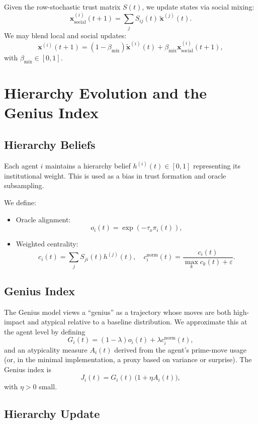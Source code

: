 \documentclass[11pt]{article}
\begin{document}
Given the row-stochastic trust matrix $S(t)$, we update states via
social mixing:
\[
  \bm{x}^{(i)}_{\text{social}}(t+1)
  = \sum_{j} S_{ij}(t) \, \tilde{\bm{x}}^{(j)}(t).
\]
We may blend local and social updates:
\[
  \bm{x}^{(i)}(t+1)
  = (1-\beta_{\text{mix}}) \tilde{\bm{x}}^{(i)}(t)
    + \beta_{\text{mix}} \bm{x}^{(i)}_{\text{social}}(t+1),
\]
with $\beta_{\text{mix}} \in [0,1]$.

\section{Hierarchy Evolution and the Genius Index}

\subsection{Hierarchy Beliefs}

Each agent $i$ maintains a hierarchy belief
$h^{(i)}(t) \in [0,1]$ representing its institutional weight.
This is used as a bias in trust formation and oracle subsampling.

We define:
\begin{itemize}[noitemsep]
  \item Oracle alignment:
    \[
      o_i(t) = \exp(-\tau_o \pi_i(t)),
    \]
  \item Weighted centrality:
    \[
      c_i(t) = \sum_j S_{ji}(t) h^{(j)}(t),
      \quad
      c_i^{\text{norm}}(t) = \frac{c_i(t)}{\max_k c_k(t) + \varepsilon}.
    \]
\end{itemize}

\subsection{Genius Index}

The Genius model views a ``genius'' as a trajectory whose moves are both
high-impact and atypical relative to a baseline distribution.
We approximate this at the agent level by defining
\[
  G_i(t) = (1-\lambda) o_i(t) + \lambda c_i^{\text{norm}}(t),
\]
and an atypicality measure $A_i(t)$ derived from the agent's prime-move
usage (or, in the minimal implementation, a proxy based on variance or
surprise).
The Genius index is
\[
  J_i(t) = G_i(t) \, \bigl( 1 + \eta A_i(t) \bigr),
\]
with $\eta > 0$ small.

\subsection{Hierarchy Update}
\end{document}
